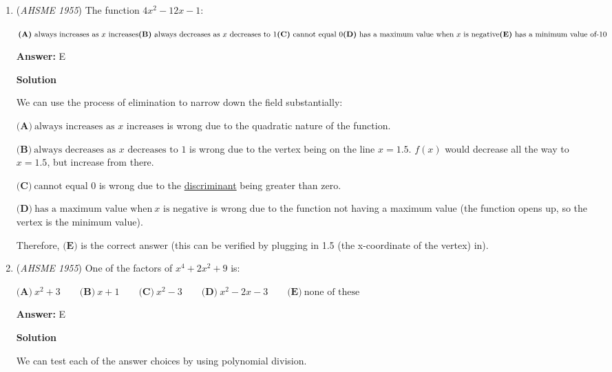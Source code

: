 \begin{enumerate}
 


	\item (\textit{AHSME 1955}) The function $4x^2-12x-1$: 


 $\textbf{(A)}\ \text{always increases as }x\text{ increases}\\ \textbf{(B)}\ \text{always decreases as }x\text{ decreases to 1}\\ \textbf{(C)}\ \text{cannot equal 0}\\ \textbf{(D)}\ \text{has a maximum value when }x\text{ is negative}\\ \textbf{(E)}\ \text{has a minimum value of-10}$

 \textbf{Answer: }E



\textbf{Solution}

We can use the process of elimination to narrow down the field substantially:

 $\textbf{(A)}\ \text{always increases as } x\text{ increases}$ is wrong due to the quadratic nature of the function.

 $\textbf{(B)}\ \text{always decreases as } x\text{ decreases to 1}$ is wrong due to the vertex being on the line $x = 1.5$.  $f(x)$ would decrease all the way to $x = 1.5$, but increase from there.

 $\textbf{(C)}\ \text{cannot equal 0}$ is wrong due to the \href{https://artofproblemsolving.com/wiki/index.php?title=Discriminant}{discriminant} being greater than zero.

 $\textbf{(D)}\ \text{has a maximum value when}\ x \text{ is negative}$ is wrong due to the function not having a maximum value (the function opens up, so the vertex is the minimum value).

 Therefore, $\textbf{(E)}$ is the correct answer (this can be verified by plugging in 1.5 (the x-coordinate of the vertex) in).

 


	\item (\textit{AHSME 1955}) One of the factors of $x^4+2x^2+9$ is: 


 $\textbf{(A)}\ x^2+3\qquad\textbf{(B)}\ x+1\qquad\textbf{(C)}\ x^2-3\qquad\textbf{(D)}\ x^2-2x-3\qquad\textbf{(E)}\ \text{none of these}$

 \textbf{Answer: }E



\textbf{Solution}

We can test each of the answer choices by using polynomial division. 


\end{enumerate}
